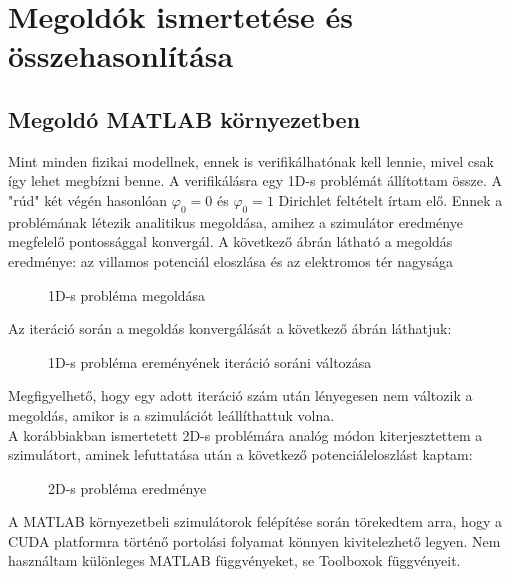 \chapter{Megoldók ismertetése és összehasonlítása}

\section{Megoldó MATLAB környezetben}
Mint minden fizikai modellnek, ennek is verifikálhatónak kell lennie, mivel csak
így lehet megbízni benne.
A  verifikálásra egy 1D-s problémát állítottam össze.
A "rúd" két végén hasonlóan $\varphi_0=0$ és $\varphi_0=1$ Dirichlet feltételt írtam elő.
Ennek a problémának létezik analitikus megoldása, amihez a szimulátor eredménye megfelelő pontossággal konvergál.
A következő ábrán látható a megoldás eredménye: az villamos potenciál eloszlása és az 
elektromos tér nagysága
\begin{figure}[H]
\centering
\caption{1D-s probléma megoldása} 
\end{figure}
\newpage

\noindent Az iteráció során a megoldás konvergálását a következő ábrán láthatjuk:
\begin{figure}[H]
\centering
\caption{1D-s probléma ereményének iteráció soráni változása} 
\end{figure}
Megfigyelhető, hogy egy adott iteráció szám után lényegesen nem változik a megoldás, amikor is
a szimulációt leállíthattuk volna.\\


\noindent A korábbiakban ismertetett 2D-s problémára analóg módon kiterjesztettem a szimulátort,
aminek lefuttatása után a következő potenciáleloszlást kaptam:
\begin{figure}[H]
\centering
\caption{2D-s probléma eredménye} 
\end{figure}
\newpage

\noindent A MATLAB környezetbeli szimulátorok felépítése során törekedtem arra,
hogy a CUDA platformra történő portolási folyamat könnyen kivitelezhető legyen.
Nem használtam különleges MATLAB függvényeket, se Toolboxok függvényeit.

